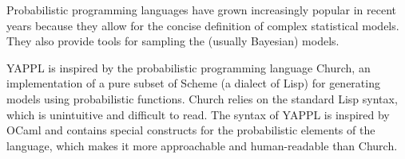 Probabilistic programming languages have grown increasingly popular in recent years 
because they allow for the concise definition of complex statistical models. They also 
provide tools for sampling the (usually Bayesian) models. 

YAPPL is inspired by the probabilistic programming language Church, an implementation of a pure subset of Scheme (a dialect of Lisp) for generating models using probabilistic functions. Church relies 
on the standard Lisp syntax, which is unintuitive and difficult to read. The syntax of 
YAPPL is inspired by OCaml and contains special constructs for the probabilistic 
elements of the language, which makes it more approachable and human-readable than Church. 